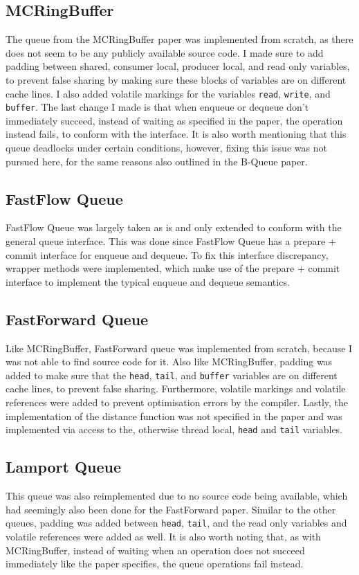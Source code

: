 \subsection{MCRingBuffer}
The queue from the MCRingBuffer paper was implemented from scratch, as there does not seem to be any publicly
available source code\cite{MCRingBuffer}.
I made sure to add padding between shared, consumer local, producer local, and read only variables, to
prevent false sharing by making sure these blocks of variables are on different cache lines.
I also added volatile markings for the variables \texttt{read}, \texttt{write}, and \texttt{buffer}.
The last change I made is that when enqueue or dequeue don't immediately succeed, instead of waiting as
specified in the paper, the operation instead fails, to conform with the interface\cite{MCRingBuffer}.
It is also worth mentioning that this queue deadlocks under certain conditions, however, fixing this issue
was not pursued here, for the same reasons also outlined in the B-Queue paper\cite{B-Queue}.

\subsection{FastFlow Queue}
FastFlow Queue was largely taken as is and only extended to conform with the general queue
interface\cite{FastFlowGithub}.
This was done since FastFlow Queue has a prepare + commit interface for enqueue and dequeue.
To fix this interface discrepancy, wrapper methods were implemented, which make use of the prepare + commit
interface to implement the typical enqueue and dequeue semantics.

\subsection{FastForward Queue}
Like MCRingBuffer, FastForward queue was implemented from scratch, because I was not able to find source code
for it\cite{FastForward}.
Also like MCRingBuffer, padding was added to make sure that the \texttt{head}, \texttt{tail}, and
\texttt{buffer} variables are on different cache lines, to prevent false sharing.
Furthermore, volatile markings and volatile references were added to prevent optimisation errors by the compiler.
Lastly, the implementation of the distance function was not specified in the paper and was implemented via
access to the, otherwise thread local, \texttt{head} and \texttt{tail} variables.

\subsection{Lamport Queue}
This queue was also reimplemented due to no source code being available, which had seemingly also been done
for the FastForward paper.
Similar to the other queues, padding was added between \texttt{head}, \texttt{tail}, and the read only
variables and volatile references were added as well.
It is also worth noting that, as with MCRingBuffer, instead of waiting when an operation does not succeed
immediately like the paper specifies, the queue operations fail instead\cite{Lamport}.
